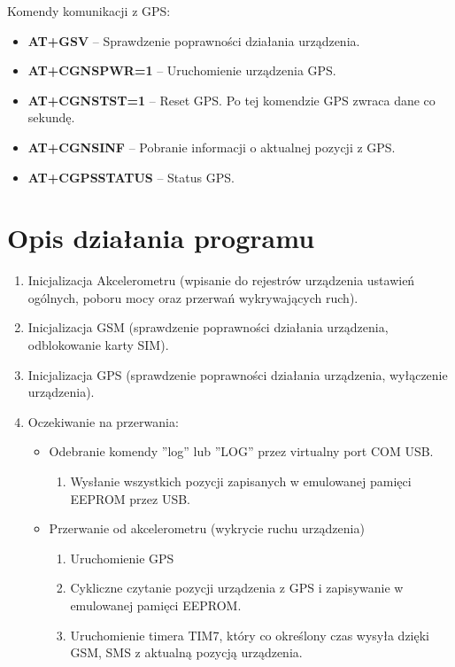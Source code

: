 \documentclass[10pt, a4paper]{article}
\begin{document}
Komendy komunikacji z GPS:
\begin{itemize}
\item \textbf{AT+GSV} -- Sprawdzenie poprawności działania urządzenia.
\item \textbf{AT+CGNSPWR=1}	-- Uruchomienie urządzenia GPS.
\item \textbf{AT+CGNSTST=1} -- Reset GPS. Po tej komendzie GPS zwraca dane co sekundę.
\item \textbf{AT+CGNSINF} -- Pobranie informacji o aktualnej pozycji z GPS.
\item \textbf{AT+CGPSSTATUS} -- Status GPS.
\end{itemize}

\section{Opis działania programu}
\begin{enumerate}
\item Inicjalizacja Akcelerometru (wpisanie do rejestrów urządzenia ustawień ogólnych, poboru mocy oraz przerwań wykrywających ruch).
\item Inicjalizacja GSM (sprawdzenie poprawności działania urządzenia, odblokowanie karty SIM).
\item Inicjalizacja GPS (sprawdzenie poprawności działania urządzenia, wyłączenie urządzenia).
\item Oczekiwanie na przerwania:
\begin{itemize}
\item Odebranie komendy ''log'' lub ''LOG'' przez virtualny port COM USB. 
\begin{enumerate}
\item Wysłanie wszystkich pozycji zapisanych w emulowanej pamięci EEPROM przez USB.
\end {enumerate}
\item Przerwanie od akcelerometru (wykrycie ruchu urządzenia)
\begin{enumerate}
\item Uruchomienie GPS
\item Cykliczne czytanie pozycji urządzenia z GPS i zapisywanie w emulowanej pamięci EEPROM.
\item Uruchomienie timera TIM7, który co określony czas wysyła dzięki GSM, SMS z aktualną pozycją urządzenia.
\end{enumerate}
\end{itemize}
\end{enumerate}
\end{document}
